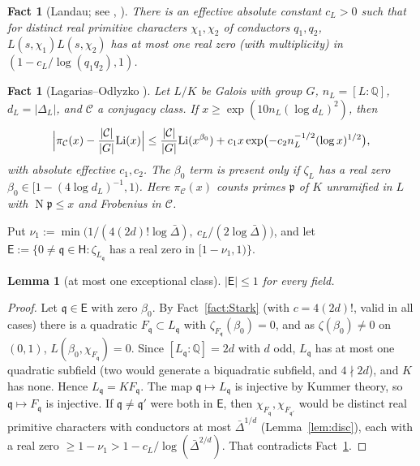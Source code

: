 \documentclass[11pt]{amsart}
\newtheorem{lemma}[theorem]{Lemma}
\newtheorem{fact}[theorem]{Fact}
\theoremstyle{definition}
\newcommand{\Q}{\mathbb{Q}}
\newcommand{\sH}{\mathsf{H}}
\newcommand{\fq}{\mathfrak{q}}
\newcommand{\fp}{\mathfrak{p}}
\newcommand{\Norm}{\operatorname{N}}
\begin{document}
\begin{fact}[{Landau; see \cite[Ch.~14]{davenport}, \cite[Fact~6.24]{lv2018}}]\label{fact:Landau}
There is an effective absolute constant $c_L>0$ such that for distinct real primitive characters $\chi_1,\chi_2$ of conductors $q_1,q_2$,
$L(s,\chi_1)L(s,\chi_2)$ has at most one real zero (with multiplicity) in $(1-c_L/\log(q_1q_2),1)$.
\end{fact}

\begin{fact}[Lagarias--Odlyzko {\cite[Thm.~1.3]{lo1977}}]\label{fact:LO}
Let $L/K$ be Galois with group $G$, $n_L=[L:\Q]$, $d_L=|\Delta_L|$, and $\mathcal C$ a conjugacy class. If $x\ge\exp(10n_L(\log d_L)^2)$,
then
\[
\Bigl|\pi_{\mathcal C}(x)-\frac{|\mathcal C|}{|G|}\mathrm{Li}(x)\Bigr|\le\frac{|\mathcal C|}{|G|}\mathrm{Li}(x^{\beta_0})+c_1x\exp\bigl(-c_2n_L^{-1/2}(\log x)^{1/2}\bigr),
\]
with absolute effective $c_1,c_2$. The $\beta_0$ term is present only if $\zeta_L$ has a real zero $\beta_0\in[1-(4\log d_L)^{-1},1)$.
Here $\pi_{\mathcal C}(x)$ counts primes $\fp$ of $K$ unramified in $L$ with $\Norm\fp\le x$ and Frobenius in $\mathcal C$.
\end{fact}

Put $\nu_1:=\min\bigl(1/(4(2d)!\log\bar\Delta),\ c_L/(2\log\bar\Delta)\bigr)$, and let $\mathsf E:=\{0\ne\fq\in\sH:\zeta_{L_\fq}$ has a real zero in $[1-\nu_1,1)\}$.

\begin{lemma}[at most one exceptional class]\label{lem:E}
$|\mathsf E|\le1$ for every field.
\end{lemma}

\begin{proof}
Let $\fq\in\mathsf E$ with zero $\beta_0$. By Fact~\ref{fact:Stark} (with $c=4(2d)!$, valid in all cases) there is a quadratic $F_\fq\subset L_\fq$ with
$\zeta_{F_\fq}(\beta_0)=0$, and as $\zeta(\beta_0)\ne0$ on $(0,1)$, $L(\beta_0,\chi_{F_\fq})=0$. Since $[L_\fq:\Q]=2d$ with $d$ odd, $L_\fq$ has at most one
quadratic subfield (two would generate a biquadratic subfield, and $4\nmid2d$), and $K$ has none. Hence $L_\fq=KF_\fq$. The map $\fq\mapsto L_\fq$ is
injective by Kummer theory, so $\fq\mapsto F_\fq$ is injective. If $\fq\ne\fq'$ were both in $\mathsf E$, then $\chi_{F_\fq},\chi_{F_{\fq'}}$ would be distinct
real primitive characters with conductors at most $\bar\Delta^{1/d}$ (Lemma~\ref{lem:disc}), each with a real zero $\ge1-\nu_1>1-c_L/\log(\bar\Delta^{2/d})$. That
contradicts Fact~\ref{fact:Landau}.
\end{proof}
\end{document}
